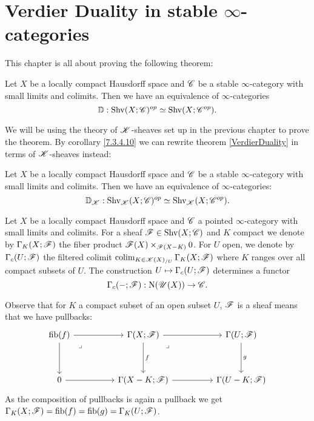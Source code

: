 \documentclass[../../thesis.tex]{subfiles}
\begin{document}
\section{Verdier Duality in stable $\infty$-categories}
This chapter is all about proving the following theorem:
\begin{theorem}[{\cite[][Theorem 5.5.5.1]{HA}}]\label{VerdierDuality}
    Let $X$ be a locally compact Hausdorff space and $\mathscr{C}$ be a stable $\infty$-category with small limits and colimits.
    Then we have an equivalence of $\infty$-categories
    \[
        \mathbb{D} : \mathrm{Shv}(X;\mathscr{C})^{op} \simeq \mathrm{Shv}(X;\mathscr{C}^{op}).
    \]
\end{theorem}
We will be using the theory of $\mathscr{K}$-sheaves set up in the previous chapter to prove the theorem.
By corollary \ref{7.3.4.10} we can rewrite theorem \ref{VerdierDuality} in terms of $\mathscr{K}$-sheaves instead:
\begin{theorem}\label{KVerdierDuality}
    Let $X$ be a locally compact Hausdorff space and $\mathscr{C}$ be a stable $\infty$-category with small limits and colimits.
    Then we have an equivalence of $\infty$-categories:
    \[
        \mathbb{D}_{\mathscr{K}} : \mathrm{Shv}_{\mathscr{K}}(X;\mathscr{C})^{op} \simeq \mathrm{Shv}_{\mathscr{K}}(X;\mathscr{C}^{op}).
    \]
\end{theorem}
\begin{definition}[{\cite[Definition 5.5.5.9]{HA}}]
    Let $X$ be a locally compact Hausdorff space and $\mathscr{C}$ a pointed $\infty$-category with small limits and colimits.
    For a sheaf $\mathscr{F} \in \mathrm{Shv}(X;\mathscr{C})$ and $K$ compact we denote by $\Gamma_K(X;\mathscr{F})$ the fiber product $\mathscr{F}(X)\times_{\mathscr{F}(X-K)}0$.
    For $U$ open, we denote by $\Gamma_c(U;\mathscr{F})$ the filtered colimit $\operatorname{colim}_{K \in\mathscr{K}(X)_{/U}}\Gamma_K(X;\mathscr{F})$ where $K$ ranges over all compact subsets of $U$.
    The construction $U \mapsto \Gamma_c(U;\mathscr{F})$ determines a functor
    \[
        \Gamma_c({-} ;\mathscr{F}) : \mathrm{N}(\mathscr{U}(X)) \to \mathscr{C} .
    \]
\end{definition}
\begin{remark}\label{GammaKXisGammaKU}
    Observe that for $K$ a compact subset of an open subset $U$, $\mathscr{F}$ is a sheaf means that we have pullbacks:
    \[\begin{tikzcd}
            {\fib(f)} && {\Gamma(X;\F)} && {\Gamma(U;\F)} \\
            \\
            0 && {\Gamma(X-K;\F)} && {\Gamma(U-K;\F)}
            \arrow[from=1-3, to=1-5]
            \arrow["f", from=1-3, to=3-3]
            \arrow[from=3-3, to=3-5]
            \arrow["g", from=1-5, to=3-5]
            \arrow["\lrcorner"{anchor=center, pos=0.125}, draw=none, from=1-3, to=3-5]
            \arrow[from=1-1, to=3-1]
            \arrow[from=3-1, to=3-3]
            \arrow[from=1-1, to=1-3]
            \arrow["\lrcorner"{anchor=center, pos=0.125}, draw=none, from=1-1, to=3-3]
        \end{tikzcd}\]
    As the composition of pullbacks is again a pullback we get $\Gamma_K(X;\mathscr{F})=\operatorname{fib}(f)=\operatorname{fib}(g)=\Gamma_K(U;\mathscr{F})$.
\end{remark}
\end{document}
